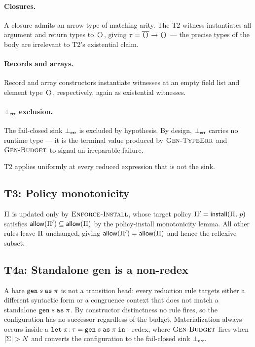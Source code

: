 \paragraph{Closures.} A closure admits an arrow type of matching arity. The T2 witness instantiates all argument and return types to $\texttt{()}$, giving $\tau = \overline{\texttt{()}} \to \texttt{()}$ --- the precise types of the body are irrelevant to T2's existential claim.

\paragraph{Records and arrays.} Record and array constructors instantiate witnesses at an empty field list and element type $\texttt{()}$, respectively, again as existential witnesses.

\paragraph{$\bot_{\mathsf{err}}$ exclusion.} The fail-closed sink $\bot_{\mathsf{err}}$ is excluded by hypothesis. By design, $\bot_{\mathsf{err}}$ carries no runtime type --- it is the terminal value produced by $\textsc{Gen-TypeErr}$ and $\textsc{Gen-Budget}$ to signal an irreparable failure.

\noindent T2 applies uniformly at every reduced expression that is not the sink.

\subsection{T3: Policy monotonicity}
\label{app:proof-sound-c}

\begin{sloppypar}
$\Pi$ is updated only by $\textsc{Enforce-Install}$, whose target policy $\Pi' = \mathsf{install}(\Pi,\,p)$ satisfies $\mathsf{allow}(\Pi') \subseteq \mathsf{allow}(\Pi)$ by the policy-install monotonicity lemma. All other rules leave $\Pi$ unchanged, giving $\mathsf{allow}(\Pi') = \mathsf{allow}(\Pi)$ and hence the reflexive subset.
\end{sloppypar}

\subsection{T4a: Standalone gen is a non-redex}
\label{app:proof-prog-a}

\begin{sloppypar}
A bare $\texttt{gen}\;s\;\texttt{as}\;\pi$ is not a transition head: every reduction rule
targets either a different syntactic form or a congruence context that does not
match a standalone $\texttt{gen}\;s\;\texttt{as}\;\pi$. By constructor distinctness no rule
fires, so the configuration has no successor regardless of the budget.
Materialization always occurs inside a
$\texttt{let}\; x\,{:}\,\tau = \texttt{gen}\;s\;\texttt{as}\;\pi\;\texttt{in}\;\cdot$ redex, where
$\textsc{Gen-Budget}$ fires when $|\Sigma| > N$ and converts the
configuration to the fail-closed sink $\bot_{\mathsf{err}}$.
\end{sloppypar}

